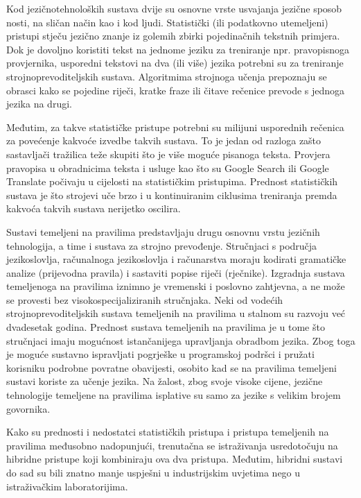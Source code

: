 \begin{multicols}{2}

Kod jezičnotehnoloških sustava dvije su osnovne vrste usvajanja jezične sposob
nosti, na sličan način kao i kod ljudi. Statistički (ili podatkovno utemeljeni) pristupi stječu jezično znanje iz golemih zbirki pojedinačnih tekstnih primjera. Dok je dovoljno koristiti tekst na jednome jeziku za treniranje npr. pravopisnoga provjernika, usporedni tekstovi na dva (ili više) jezika potrebni su za treniranje strojnoprevoditeljskih sustava. Algoritmima strojnoga učenja prepoznaju se obrasci kako se pojedine riječi, kratke fraze ili čitave rečenice prevode s jednoga jezika na drugi.

Međutim, za takve statističke pristupe potrebni su milijuni usporednih rečenica za povećenje kakvoće izvedbe takvih sustava. To je jedan od razloga zašto sastavljači tražilica teže skupiti što je više moguće pisanoga teksta. Provjera pravopisa u obradnicima teksta i usluge kao što su Google Search ili Google Translate počivaju u cijelosti na statističkim pristupima. Prednost statističkih sustava je što strojevi uče brzo i u kontinuiranim ciklusima treniranja premda kakvoća takvih sustava nerijetko oscilira.

Sustavi temeljeni na pravilima predstavljaju drugu osnovnu vrstu jezičnih tehnologija, a time i sustava za strojno prevođenje. Stručnjaci s područja jezikoslovlja, računalnoga jezikoslovlja i računarstva moraju kodirati gramatičke analize (prijevodna pravila) i sastaviti popise riječi (rječnike). Izgradnja sustava temeljenoga na pravilima iznimno je vremenski i poslovno zahtjevna, a ne može se provesti bez visokospecijaliziranih stručnjaka. Neki od vodećih strojnoprevoditeljskih sustava temeljenih na pravilima u stalnom su razvoju već dvadesetak godina. Prednost sustava temeljenih na pravilima je u tome što stručnjaci imaju mogućnost istančanijega upravljanja obradbom jezika. Zbog toga je moguće sustavno ispravljati pogrješke u programskoj podršci i pružati korisniku podrobne povratne obavijesti, osobito kad se na pravilima temeljeni sustavi koriste za učenje jezika. Na žalost, zbog svoje visoke cijene, jezične tehnologije temeljene na pravilima isplative su samo za jezike s velikim brojem govornika.


Kako su prednosti i nedostatci statističkih pristupa i pristupa temeljenih na pravilima međusobno nadopunjući, trenutačna se istraživanja usredotočuju na hibridne pristupe koji kombiniraju ova dva pristupa. Međutim, hibridni sustavi do sad su bili znatno manje uspješni u industrijskim uvjetima nego u istraživačkim laboratorijima.


\end{multicols}
